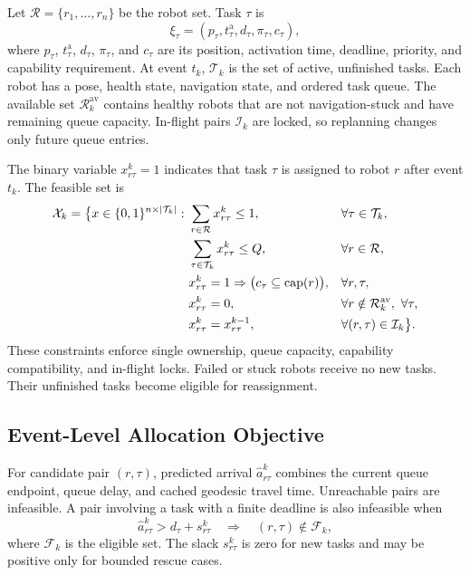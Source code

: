 \documentclass[10pt,letterpaper,onecolumn]{IEEEtran}
\begin{document}
Let $\mathcal{R}=\{r_1,\ldots,r_n\}$ be the robot set. Task $\tau$ is
\[
  \xi_\tau=(p_\tau,t^{\mathrm a}_\tau,d_\tau,\pi_\tau,c_\tau),
\]
where $p_\tau$, $t^{\mathrm a}_\tau$, $d_\tau$, $\pi_\tau$, and $c_\tau$
are its position, activation time, deadline, priority, and capability
requirement. At event $t_k$, $\mathcal{T}_k$ is the set of active, unfinished
tasks. Each robot has a pose, health state, navigation state, and ordered task
queue. The available set $\mathcal{R}^{\mathrm{av}}_k$ contains healthy robots
that are not navigation-stuck and have remaining queue capacity. In-flight
pairs $\mathcal I_k$ are locked, so replanning changes only future queue
entries.

The binary variable $x_{r\tau}^k=1$ indicates that task $\tau$ is assigned to
robot $r$ after event $t_k$. The feasible set is
\begin{align}
  \mathcal{X}_k=\bigl\{x\in\{0,1\}^{n\times|\mathcal{T}_k|}:&
  \ \sum_{r\in\mathcal{R}}x_{r\tau}^k\leq1, &&\forall\tau\in\mathcal{T}_k,\label{eq:single-owner}\\
  &\ \sum_{\tau\in\mathcal{T}_k}x_{r\tau}^k\leq Q, &&\forall r\in\mathcal{R},\label{eq:queue-cap}\\
  &\ x_{r\tau}^k=1\Rightarrow
      \bigl(c_\tau\subseteq\mathrm{cap}(r)\bigr), &&\forall r,\tau,\label{eq:cap-feas}\\
  &\ x_{r\tau}^k=0, &&\forall r\notin\mathcal R_k^{\rm av},\ \forall\tau,\\
  &\ x_{r\tau}^k=x_{r\tau}^{k-1}, &&\forall(r,\tau)\in\mathcal{I}_k
  \bigr\}.\label{eq:feasible-set}
\end{align}
These constraints enforce single ownership, queue capacity, capability
compatibility, and in-flight locks. Failed or stuck robots receive no new
tasks. Their unfinished tasks become eligible for reassignment.

\subsection{Event-Level Allocation Objective}

For candidate pair $(r,\tau)$, predicted arrival $\hat a_{r\tau}^k$ combines
the current queue endpoint, queue delay, and cached geodesic travel time.
Unreachable pairs are infeasible. A pair involving a task with a finite
deadline is also infeasible when
\begin{equation}
  \hat a_{r\tau}^k>d_\tau+s_{r\tau}^k
  \quad\Longrightarrow\quad (r,\tau)\notin\mathcal{F}_k ,
  \label{eq:admission-gate}
\end{equation}
where $\mathcal F_k$ is the eligible set. The slack $s_{r\tau}^k$ is zero for
new tasks and may be positive only for bounded rescue cases.
\end{document}
